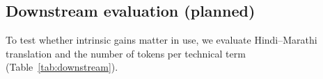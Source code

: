 \subsection{Downstream evaluation (planned)}
\label{sec:downstream}

To test whether intrinsic gains matter in use, we evaluate Hindi--Marathi translation and
the number of tokens per technical term (Table~\ref{tab:downstream}).

\begin{table}[t]
\centering
\small
{}
\caption{Downstream evaluation.}
\label{tab:downstream}
\end{table}